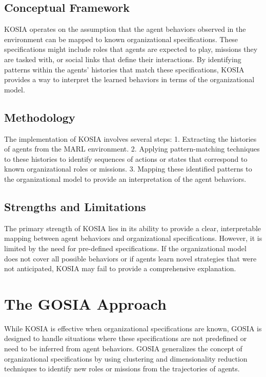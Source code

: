 \documentclass[sn-mathphys-num]{sn-jnl}%
\theoremstyle{thmstyleone}%
\theoremstyle{thmstyletwo}%
\theoremstyle{thmstylethree}%
\begin{document}
\subsection{Conceptual Framework}

KOSIA operates on the assumption that the agent behaviors observed in the environment can be mapped to known organizational specifications. These specifications might include roles that agents are expected to play, missions they are tasked with, or social links that define their interactions. By identifying patterns within the agents' histories that match these specifications, KOSIA provides a way to interpret the learned behaviors in terms of the organizational model.

\subsection{Methodology}

The implementation of KOSIA involves several steps:
1. Extracting the histories of agents from the MARL environment.
2. Applying pattern-matching techniques to these histories to identify sequences of actions or states that correspond to known organizational roles or missions.
3. Mapping these identified patterns to the organizational model to provide an interpretation of the agent behaviors.

\subsection{Strengths and Limitations}

The primary strength of KOSIA lies in its ability to provide a clear, interpretable mapping between agent behaviors and organizational specifications. However, it is limited by the need for pre-defined specifications. If the organizational model does not cover all possible behaviors or if agents learn novel strategies that were not anticipated, KOSIA may fail to provide a comprehensive explanation.

\section{The GOSIA Approach}
\label{sec:gosia}

While KOSIA is effective when organizational specifications are known, GOSIA is designed to handle situations where these specifications are not predefined or need to be inferred from agent behaviors. GOSIA generalizes the concept of organizational specifications by using clustering and dimensionality reduction techniques to identify new roles or missions from the trajectories of agents.
\end{document}
